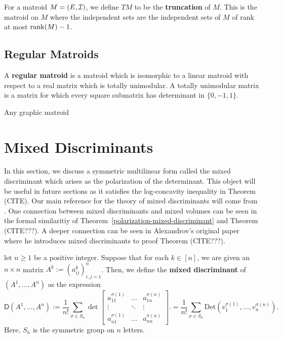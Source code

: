 \documentclass{puthesis-UG}
\begin{document}
For a matroid $M = (E, \mathcal{I})$, we define $TM$ to be the \textbf{truncation} of $M$. This is the matroid on $M$ where the independent sets are the independent sets of $M$ of rank at most $\operatorname{rank}(M) - 1$.  

\subsection{Regular Matroids}

\begin{defn}
	A \textbf{regular matroid} is a matroid which is isomorphic to a linear matroid with respect to a real matrix which is totally unimodular. A totally unimodular matrix is a matrix for which every square submatrix has determinant in $\{0, -1, 1\}$. 
\end{defn}

\begin{prop}
	Any graphic matroid
\end{prop}
\section{Mixed Discriminants}

In this section, we discuss a symmetric multilinear form called the mixed discriminant which arises as the polarization of the determinant. This object will be useful in future sections as it satisfies the log-concavity inequality in Theorem (CITE). Our main reference for the theory of mixed discriminants will come from \cite{bapat_raghavan_1997}. One connection between mixed discriminants and mixed volumes can be seen in the formal similaritiy of Theorem~\ref{polarization-mixed-discriminant} and Theorem (CITE???). A deeper connection can be seen in Alexandrov's original paper \cite{aleksandrov} where he introduces mixed discriminants to proof Theorem (CITE???). 

\begin{defn} \label{defn-mixed-discriminant}
	let $n \geq 1$ be a positive integer. Suppose that for each $k \in [n]$, we are given an $n \times n$ matrix $A^k := (a_{ij}^k)_{i, j = 1}^n$. Then, we define the \textbf{mixed discriminant} of $(A^1, \ldots, A^n)$ as the expression 
	\[
		\mathsf{D}(A^1, \ldots, A^n) := \frac{1}{n!} \sum_{\sigma \in S_n} 
		\det 
		\begin{bmatrix} 
			a_{11}^{\sigma(1)} & \ldots & a_{1n}^{\sigma(n)} \\
			\vdots & \ddots & \vdots \\
			a_{n1}^{\sigma(1)} & \ldots & a_{nn}^{\sigma(n)}
		\end{bmatrix}. = \frac{1}{n!} \sum_{\sigma \in S_n} \text{Det}(v^{\sigma(1)}_{1}, \ldots, v_{n}^{\sigma(n)}).
	\]
	Here, $S_n$ is the symmetric group on $n$ letters. 
\end{defn}
\end{document}
